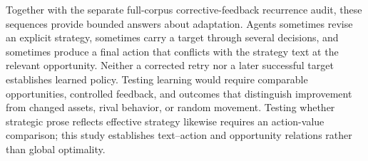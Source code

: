 Together with the separate full-corpus corrective-feedback recurrence audit, these sequences provide bounded answers about adaptation. Agents sometimes revise an explicit strategy, sometimes carry a target through several decisions, and sometimes produce a final action that conflicts with the strategy text at the relevant opportunity. Neither a corrected retry nor a later successful target establishes learned policy. Testing learning would require comparable opportunities, controlled feedback, and outcomes that distinguish improvement from changed assets, rival behavior, or random movement. Testing whether strategic prose reflects effective strategy likewise requires an action-value comparison; this study establishes text--action and opportunity relations rather than global optimality.
